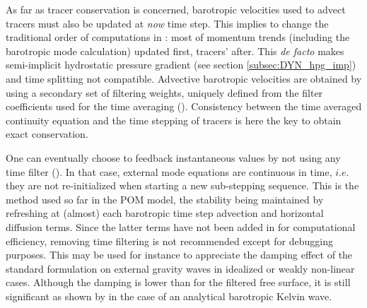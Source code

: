 \documentclass[../tex_main/NEMO_manual]{subfiles}
\begin{document}

As far as tracer conservation is concerned,
barotropic velocities used to advect tracers must also be updated at \textit{now} time step.
This implies to change the traditional order of computations in \NEMO:
most of momentum trends (including the barotropic mode calculation) updated first, tracers' after.
This \textit{de facto} makes semi-implicit hydrostatic pressure gradient
(see section \autoref{subsec:DYN_hpg_imp})
and time splitting not compatible.
Advective barotropic velocities are obtained by using a secondary set of filtering weights,
uniquely defined from the filter coefficients used for the time averaging (\citet{Shchepetkin_McWilliams_OM05}).
Consistency between the time averaged continuity equation and the time stepping of tracers is here the key to
obtain exact conservation.


One can eventually choose to feedback instantaneous values by not using any time filter
(). 
In that case, external mode equations are continuous in time,
$i.e.$ they are not re-initialized when starting a new sub-stepping sequence.
This is the method used so far in the POM model, the stability being maintained by
refreshing at (almost) each barotropic time step advection and horizontal diffusion terms.
Since the latter terms have not been added in \NEMO for computational efficiency,
removing time filtering is not recommended except for debugging purposes.
This may be used for instance to appreciate the damping effect of the standard formulation on
external gravity waves in idealized or weakly non-linear cases.
Although the damping is lower than for the filtered free surface,
it is still significant as shown by \citet{Levier2007} in the case of an analytical barotropic Kelvin wave.
\end{document}
